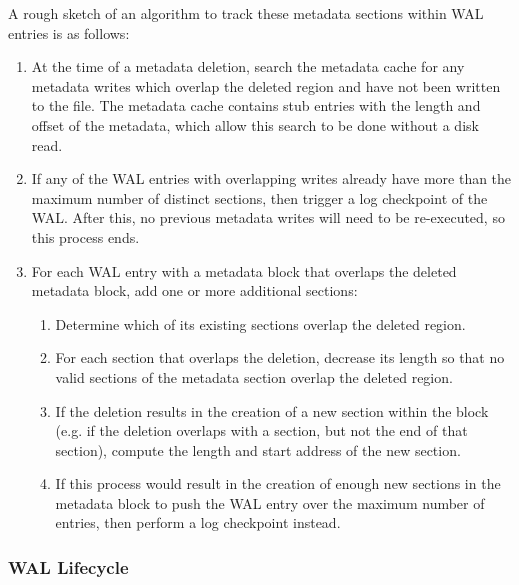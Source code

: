     A rough sketch of an algorithm to track these metadata sections within WAL entries is as follows:
    
    \begin{enumerate}
        \item At the time of a metadata deletion, search the metadata cache for any metadata writes which overlap the deleted region and have not been written to the file. The metadata cache contains stub entries with the length and offset of the metadata, which allow this search to be done without a disk read.
        
        \item If any of the WAL entries with overlapping writes already have more than the maximum number of distinct sections, then trigger a log checkpoint of the WAL. After this, no previous metadata writes will need to be re-executed, so this process ends.

        \item For each WAL entry with a metadata block that overlaps the deleted metadata block, add one or more additional sections:
        
        \begin{enumerate}
            \item Determine which of its existing sections overlap the deleted region.

            \item For each section that overlaps the deletion, decrease its length so that no valid sections of the metadata section overlap the deleted region.

            \item If the deletion results in the creation of a new section within the block (e.g. if the deletion overlaps with a section, but not the end of that section), compute the length and start address of the new section.

            \item If this process would result in the creation of enough new sections in the metadata block to push the WAL entry over the maximum number of entries, then perform a log checkpoint instead.
        \end{enumerate}
    \end{enumerate}

\subsubsection{WAL Lifecycle}

